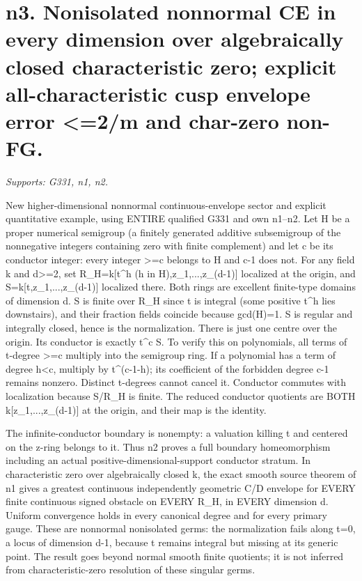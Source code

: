 \section{n3. Nonisolated nonnormal CE in every dimension over algebraically closed characteristic zero; explicit all-characteristic cusp envelope error \textless{}=2/m and char-zero non-FG.}
\textit{Supports: G331, n1, n2.}

New higher-dimensional nonnormal continuous-envelope sector and explicit quantitative example, using ENTIRE qualified G331 and own n1--n2. Let H be a proper numerical semigroup (a finitely generated additive subsemigroup of the nonnegative integers containing zero with finite complement) and let c be its conductor integer: every integer \textgreater{}=c belongs to H and c-1 does not. For any field k and d\textgreater{}=2, set R\_H=k[t\textasciicircum{}h (h in H),z\_1,...,z\_(d-1)] localized at the origin, and S=k[t,z\_1,...,z\_(d-1)] localized there. Both rings are excellent finite-type domains of dimension d. S is finite over R\_H since t is integral (some positive t\textasciicircum{}h lies downstairs), and their fraction fields coincide because gcd(H)=1. S is regular and integrally closed, hence is the normalization. There is just one centre over the origin. Its conductor is exactly t\textasciicircum{}c S. To verify this on polynomials, all terms of t-degree \textgreater{}=c multiply into the semigroup ring. If a polynomial has a term of degree h\textless{}c, multiply by t\textasciicircum{}(c-1-h); its coefficient of the forbidden degree c-1 remains nonzero. Distinct t-degrees cannot cancel it. Conductor commutes with localization because S/R\_H is finite. The reduced conductor quotients are BOTH k[z\_1,...,z\_(d-1)] at the origin, and their map is the identity.

The infinite-conductor boundary is nonempty: a valuation killing t and centered on the z-ring belongs to it. Thus n2 proves a full boundary homeomorphism including an actual positive-dimensional-support conductor stratum. In characteristic zero over algebraically closed k, the exact smooth source theorem of n1 gives a greatest continuous independently geometric C/D envelope for EVERY finite continuous signed obstacle on EVERY R\_H, in EVERY dimension d. Uniform convergence holds in every canonical degree and for every primary gauge. These are nonnormal nonisolated germs: the normalization fails along t=0, a locus of dimension d-1, because t remains integral but missing at its generic point. The result goes beyond normal smooth finite quotients; it is not inferred from characteristic-zero resolution of these singular germs.

